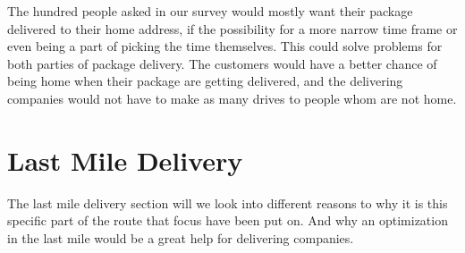 \documentclass[12pt]{report}
\begin{document}
The hundred people asked in our survey would mostly want their package delivered to their home address, if the possibility for a more narrow time frame or even being a part of picking the time themselves. This could solve problems for both parties of package delivery. The customers would have a better chance of being home when their package are getting delivered, and the delivering companies would not have to make as many drives to people whom are not home. 


\section{Last Mile Delivery}
The last mile delivery section will we look into different reasons to why it is this specific part of the route that focus have been put on. And why an optimization in the last mile would be a great help for delivering companies.
\end{document}
